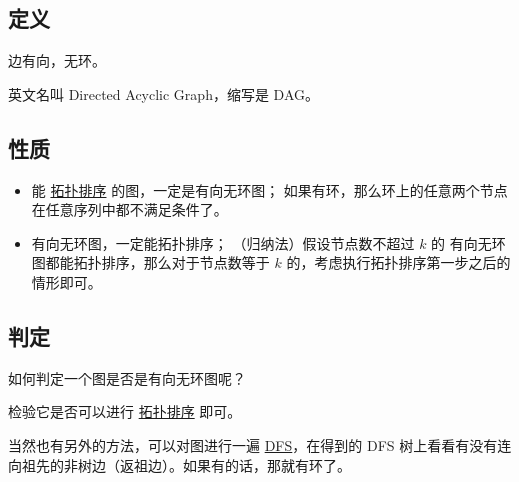 
\subsection{定义}

边有向，无环。

英文名叫 Directed Acyclic Graph，缩写是 DAG。

\subsection{性质}

\begin{itemize}
\item 能 \href{/graph/topo}{拓扑排序} 的图，一定是有向无环图；
  如果有环，那么环上的任意两个节点在任意序列中都不满足条件了。
\item 有向无环图，一定能拓扑排序；
  （归纳法）假设节点数不超过 $k$ 的 有向无环图都能拓扑排序，那么对于节点数等于 $k$ 的，考虑执行拓扑排序第一步之后的情形即可。
\end{itemize}

\subsection{判定}

如何判定一个图是否是有向无环图呢？

检验它是否可以进行 \href{/graph/topo}{拓扑排序} 即可。

当然也有另外的方法，可以对图进行一遍 \href{/search/dfs}{DFS}，在得到的 DFS 树上看看有没有连向祖先的非树边（返祖边）。如果有的话，那就有环了。

